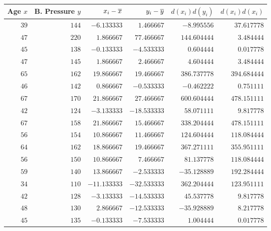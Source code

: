 \begin{tabular}{rrrrrr}                                                                      \toprule
Age $x$ & B. Pressure $y$ & $x_i - \overline{x}$ & $y_i - \overline{y}$ & $d(x_i)d(y_i)$ & $d(x_i)d(x_i)$ \\\midrule
$39$    & $144$           & $-6.133333$   & $1.466667$    & $-8.995556$   & $37.617778$    \\[4pt]
$47$    & $220$           & $1.866667$    & $77.466667$   & $144.604444$  & $3.484444$     \\[4pt]
$45$    & $138$           & $-0.133333$   & $-4.533333$   & $0.604444$    & $0.017778$     \\[4pt]
$47$    & $145$           & $1.866667$    & $2.466667$    & $4.604444$    & $3.484444$     \\[4pt]
$65$    & $162$           & $19.866667$   & $19.466667$   & $386.737778$  & $394.684444$   \\[4pt]
$46$    & $142$           & $0.866667$    & $-0.533333$   & $-0.462222$   & $0.751111$     \\[4pt]
$67$    & $170$           & $21.866667$   & $27.466667$   & $600.604444$  & $478.151111$   \\[4pt]
$42$    & $124$           & $-3.133333$   & $-18.533333$  & $58.071111$   & $9.817778$     \\[4pt]
$67$    & $158$           & $21.866667$   & $15.466667$   & $338.204444$  & $478.151111$   \\[4pt]
$56$    & $154$           & $10.866667$   & $11.466667$   & $124.604444$  & $118.084444$   \\[4pt]
$64$    & $162$           & $18.866667$   & $19.466667$   & $367.271111$  & $355.951111$   \\[4pt]
$56$    & $150$           & $10.866667$   & $7.466667$    & $81.137778$   & $118.084444$   \\[4pt]
$59$    & $140$           & $13.866667$   & $-2.533333$   & $-35.128889$  & $192.284444$   \\[4pt]
$34$    & $110$           & $-11.133333$  & $-32.533333$  & $362.204444$  & $123.951111$   \\[4pt]
$42$    & $128$           & $-3.133333$   & $-14.533333$  & $45.537778$   & $9.817778$     \\[4pt]
$48$    & $130$           & $2.866667$    & $-12.533333$  & $-35.928889$  & $8.217778$     \\[4pt]
$45$    & $135$           & $-0.133333$   & $-7.533333$   & $1.004444$    & $0.017778$     \\[4pt]

\end{tabular}
